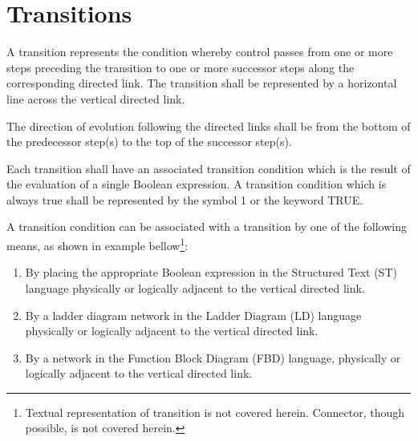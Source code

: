 \documentclass[a4paper]{ltxdoc}
\begin{document}
\section{Transitions}
A transition represents the condition whereby control passes from one or more steps preceding the transition to one or more successor steps along the corresponding directed link. The transition shall be represented by a horizontal line across the vertical directed link.

The direction of evolution following the directed links shall be from the bottom of the predecessor step(s) to the top of the successor step(s).

Each transition shall have an associated transition condition which is the result of the evaluation of a single Boolean expression. A transition condition which is always true shall be represented by the symbol 1 or the keyword TRUE.

A transition condition can be associated with a transition by one of the following means, as
shown in example bellow\footnote{Textual representation of transition is not covered herein. Connector, though possible, is not covered herein.}:
\begin{enumerate}
\item By placing the appropriate Boolean expression in the Structured Text (ST) language physically or logically adjacent to the vertical directed link.
\item By a ladder diagram network in the Ladder Diagram (LD) language physically or logically adjacent to the vertical directed link.
\item By a network in the Function Block Diagram (FBD) language, physically or logically adjacent to the vertical directed link.
\end{enumerate}

\begin{codeexample}[width=6cm]
\end{codeexample}
\end{document}
